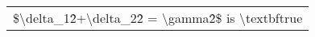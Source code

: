 \begin{tabular}{r}
\$\textbackslash{}delta\_1\^2+\textbackslash{}delta\_2\^2 = \textbackslash{}gamma\^2\$ is \textbackslash{}textbf{true} \\
\end{tabular}%
